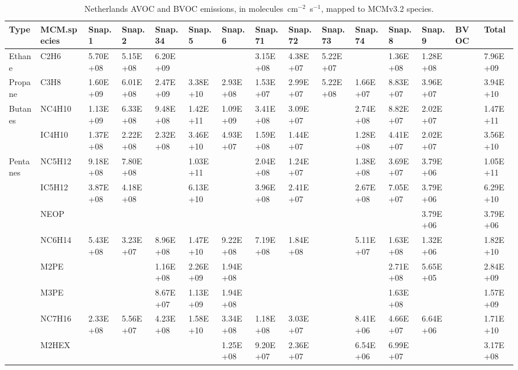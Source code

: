 \tiny
\begin{longtable}{lllllllllllllll}
	\caption{Netherlands AVOC and BVOC emissions, in molecules~cm$^{-2}$~s$^{-1}$, mapped to MCMv3.2 species.}\\%
	\hline \hline
	\textbf{Type} & \textbf{MCM.species} & \textbf{Snap.1} & \textbf{Snap.2} & \textbf{Snap.34} & \textbf{Snap.5} & \textbf{Snap.6} & \textbf{Snap.71} & \textbf{Snap.72} & \textbf{Snap.73} & \textbf{Snap.74} & \textbf{Snap.8} & \textbf{Snap.9} & \textbf{BVOC} & \textbf{Total}\\
	\endhead
	\hline
	Ethane & C2H6 & 5.70E+08 & 5.15E+08 & 6.20E+09 &  &  & 3.15E+08 & 4.38E+07 & 5.22E+07 &  & 1.36E+08 & 1.28E+08 &  & 7.96E+09 \\
	\hline Propane & C3H8 & 1.60E+09 & 6.01E+08 & 2.47E+09 & 3.38E+10 & 2.93E+08 & 1.53E+07 & 2.99E+07 & 5.22E+08 & 1.66E+07 & 8.83E+07 & 3.96E+07 &  & 3.94E+10 \\ \hline
	\multirow{2}{*}{Butanes} & NC4H10 & 1.13E+09 & 6.33E+08 & 9.48E+08 & 1.42E+11 & 1.09E+09 & 3.41E+08 & 3.09E+07 &  & 2.74E+08 & 8.82E+07 & 2.02E+07 &  & 1.47E+11 \\
	 & IC4H10 & 1.37E+08 & 2.22E+08 & 2.32E+08 & 3.46E+10 & 4.93E+07 & 1.59E+08 & 1.44E+07 &  & 1.28E+08 & 4.41E+07 & 2.02E+07 &  & 3.56E+10 \\
	\hline \multirow{3}{*}{Pentanes} & NC5H12 & 9.18E+08 & 7.80E+08 &  & 1.03E+11 &  & 2.04E+08 & 1.24E+07 &  & 1.38E+08 & 3.69E+07 & 3.79E+06 &  & 1.05E+11 \\
	 & IC5H12 & 3.87E+08 & 4.18E+08 &  & 6.13E+10 &  & 3.96E+08 & 2.41E+07 &  & 2.67E+08 & 7.05E+07 & 3.79E+06 &  & 6.29E+10 \\
	 & NEOP &  &  &  &  &  &  &  &  &  &  & 3.79E+06 &  & 3.79E+06 \\
	\hline \parbox[t]{2mm}{} & NC6H14 & 5.43E+08 & 3.23E+07 & 8.96E+08 & 1.47E+10 & 9.22E+08 & 7.19E+08 & 1.84E+08 &  & 5.11E+07 & 1.63E+08 & 1.32E+06 &  & 1.82E+10 \\
	 & M2PE &  &  & 1.16E+08 & 2.26E+09 & 1.94E+08 &  &  &  &  & 2.71E+08 & 5.65E+05 &  & 2.84E+09 \\
	 & M3PE &  &  & 8.67E+07 & 1.13E+09 & 1.94E+08 &  &  &  &  & 1.63E+08 &  &  & 1.57E+09 \\
	 & NC7H16 & 2.33E+08 & 5.56E+07 & 4.23E+08 & 1.58E+10 & 3.34E+08 & 1.18E+08 & 3.03E+07 &  & 8.41E+06 & 4.66E+07 & 6.64E+06 &  & 1.71E+10 \\
	 & M2HEX &  &  &  &  & 1.25E+08 & 9.20E+07 & 2.36E+07 &  & 6.54E+06 & 6.99E+07 &  &  & 3.17E+08 \\

\end{longtable}
